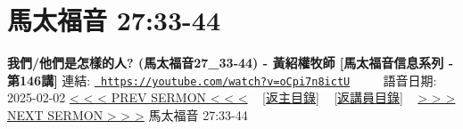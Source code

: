 \documentclass{book}
\begin{document}
\section{馬太福音 27:33-44}
\label{sec:oCpi7n8ictU}
\textbf{我們/他們是怎樣的人? (馬太福音27\_33-44) - 黃紹權牧師  [馬太福音信息系列 - 第146講]}
\newline
\newline
連結: \href{https://youtube.com/watch?v=oCpi7n8ictU}{\texttt{ https://youtube.com/watch?v=oCpi7n8ictU}} ~~~~ 語音日期: 2025-02-02 
\newline
\newline
\hyperref[sec:HaaLhKYBRSg]{< < < PREV SERMON < < <}
~
\hyperlink{toc}{[返主目錄]}
~
\hyperref[ch:preacher15]{[返講員目錄]}
~
\hyperref[sec:7upP8JmD6zY]{> > > NEXT SERMON > > >}
\newline
\newline
馬太福音 27:33-44
\newline
\end{document}
